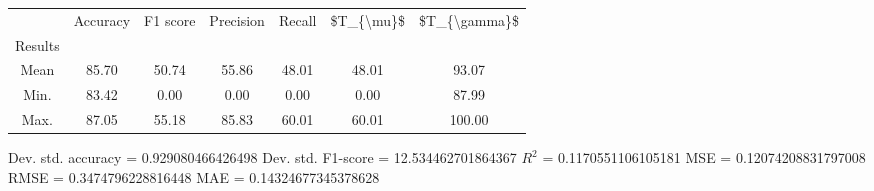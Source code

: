 \begin{tabular}{|c|c|c|c|c|c|c|}
\toprule
{} &  Accuracy &  F1 score &  Precision &  Recall &  \$T\_\{\textbackslash mu\}\$ &  \$T\_\{\textbackslash gamma\}\$ \\
Results &           &           &            &         &            &               \\
\hline
Mean    &     85.70 &     50.74 &      55.86 &   48.01 &      48.01 &         93.07 \\
Min.    &     83.42 &      0.00 &       0.00 &    0.00 &       0.00 &         87.99 \\
Max.    &     87.05 &     55.18 &      85.83 &   60.01 &      60.01 &        100.00 \\
\bottomrule
\end{tabular}

 Dev. std. accuracy = 0.929080466426498
 Dev. std. F1-score = 12.534462701864367
 $R^2$ = 0.1170551106105181
 MSE = 0.12074208831797008
 RMSE = 0.3474796228816448
 MAE = 0.14324677345378628